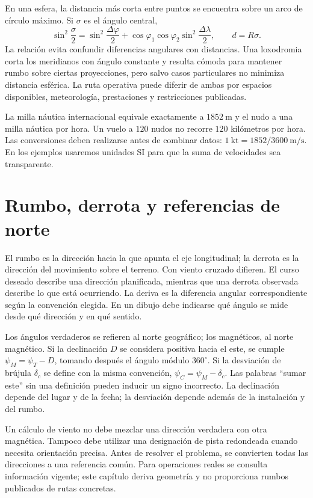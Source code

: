 En una esfera, la distancia más corta entre puntos se encuentra sobre un arco de círculo máximo. Si $\sigma$ es el ángulo central,
\begin{equation}
\sin^2\frac\sigma2=\sin^2\frac{\Delta\varphi}2+
\cos\varphi_1\cos\varphi_2\sin^2\frac{\Delta\lambda}2,
\qquad d=R\sigma.
\end{equation}
La relación evita confundir diferencias angulares con distancias. Una loxodromia corta los meridianos con ángulo constante y resulta cómoda para mantener rumbo sobre ciertas proyecciones, pero salvo casos particulares no minimiza distancia esférica. La ruta operativa puede diferir de ambas por espacios disponibles, meteorología, prestaciones y restricciones publicadas.

La milla náutica internacional equivale exactamente a $1852\ \mathrm m$ y el nudo a una milla náutica por hora. Un vuelo a $120$ nudos no recorre $120$ kilómetros por hora. Las conversiones deben realizarse antes de combinar datos: $1\ \mathrm{kt}=1852/3600\ \mathrm{m/s}$. En los ejemplos usaremos unidades SI para que la suma de velocidades sea transparente.

\section{Rumbo, derrota y referencias de norte}
El rumbo es la dirección hacia la que apunta el eje longitudinal; la derrota es la dirección del movimiento sobre el terreno. Con viento cruzado difieren. El curso deseado describe una dirección planificada, mientras que una derrota observada describe lo que está ocurriendo. La deriva es la diferencia angular correspondiente según la convención elegida. En un dibujo debe indicarse qué ángulo se mide desde qué dirección y en qué sentido.

Los ángulos verdaderos se refieren al norte geográfico; los magnéticos, al norte magnético. Si la declinación $D$ se considera positiva hacia el este, se cumple $\psi_M=\psi_T-D$, tomando después el ángulo módulo $360^\circ$. Si la desviación de brújula $\delta_c$ se define con la misma convención, $\psi_C=\psi_M-\delta_c$. Las palabras ``sumar este'' sin una definición pueden inducir un signo incorrecto. La declinación depende del lugar y de la fecha; la desviación depende además de la instalación y del rumbo.

Un cálculo de viento no debe mezclar una dirección verdadera con otra magnética. Tampoco debe utilizar una designación de pista redondeada cuando necesita orientación precisa. Antes de resolver el problema, se convierten todas las direcciones a una referencia común. Para operaciones reales se consulta información vigente; este capítulo deriva geometría y no proporciona rumbos publicados de rutas concretas.

